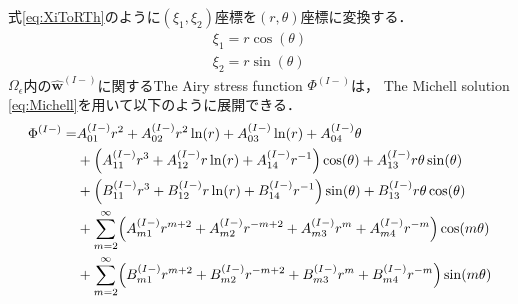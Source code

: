 式\eqref{eq:XiToRTh}のように$(\xi_{1},\xi_{2})$座標を$(r,\theta)$座標に変換する．
\begin{align}
	\xi_{1}=r\cos(\theta)
	\nonumber
	\\
	\xi_{2}=r\sin(\theta)
	\label{eq:XiToRTh}
\end{align}
$\Omega_\epsilon$内の$\hat{\bm{w}}^{(I-)}$に関するThe Airy stress function $\Phi^{(I-)}$は，
The Michell solution \eqref{eq:Michell}を用いて以下のように展開できる．
\begin{align}
	\Phi^{(I-)} =&A_{01}^{(I-)}r^2+A_{02}^{(I-)}r^2\ln(r)+A_{03}^{(I-)}\ln(r)+A_{04}^{(I-)}\theta
	\nonumber
	\\
	&+\Bigl(A_{11}^{(I-)}r^3+A_{12}^{(I-)}r\ln(r)+A_{14}^{(I-)}r^{-1}\Bigr)\cos(\theta)+A_{13}^{(I-)}r\theta \sin(\theta)
	\nonumber
	\\
	&+\Bigl(B_{11}^{(I-)}r^3+B_{12}^{(I-)}r\ln(r)+B_{14}^{(I-)}r^{-1}\Bigr)\sin(\theta)+B_{13}^{(I-)}r\theta \cos(\theta)
	\nonumber
	\\
	&+\sum_{m=2}^{\infty}\Bigl(A_{m1}^{(I-)}r^{m+2}+A_{m2}^{(I-)}r^{-m+2}
	+A_{m3}^{(I-)}r^{m}+A_{m4}^{(I-)}r^{-m}\Bigr)\cos(m\theta)
	\nonumber
	\\
	&+\sum_{m=2}^{\infty}\Bigl(B_{m1}^{(I-)}r^{m+2}+B_{m2}^{(I-)}r^{-m+2}
	+B_{m3}^{(I-)}r^{m}+B_{m4}^{(I-)}r^{-m}\Bigr)\sin(m\theta)
	\label{eq:AiryIn1}
\end{align}

